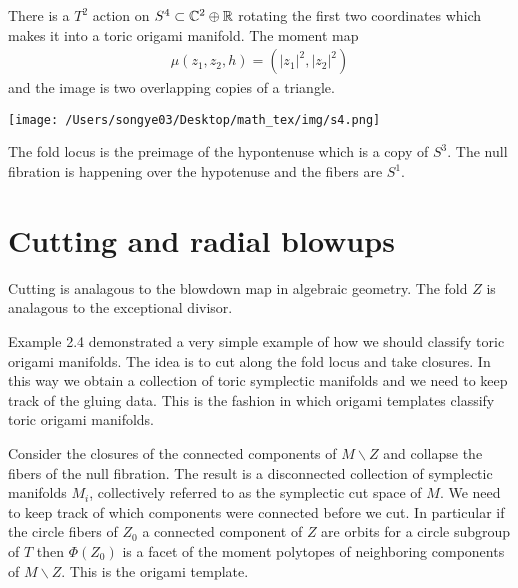 \documentclass[12pt]{article}
\begin{document}
\begin{example}
    There is a $T^2$ action on $S^4 \subset \mathbb{C}^2\oplus \mathbb{R}$
    rotating the first two coordinates which makes it into a toric origami manifold. 
    The moment map \begin{align*}
        \mu(z_1,z_2,h) = (|z_1|^2, |z_2|^2)
    \end{align*} and the image is two overlapping copies of a triangle.
    \begin{center}
        \texttt{[image: /Users/songye03/Desktop/math\_tex/img/s4.png]}
    \end{center}
        
    The fold locus is the preimage of the hypontenuse which is a copy of $S^3$.
    The null fibration is happening over the hypotenuse and the fibers are $S^1$.


    \hfill 

\end{example}

\section{Cutting and radial blowups}
Cutting is analagous to the blowdown map in algebraic geometry. The fold $Z$ is analagous 
to the exceptional divisor. 

\hfill

Example 2.4 demonstrated a very simple example of how we should classify toric origami manifolds.
The idea is to cut along the fold locus and take closures. In this way 
we obtain a collection of toric symplectic manifolds and we need to keep track of
the gluing data. This is the fashion in which origami templates classify toric origami manifolds.

\hfill

Consider the closures of the connected components of $M\backslash Z$ and collapse the fibers of the
null fibration. The result is a disconnected collection of symplectic manifolds $M_i$,
collectively referred to as the symplectic cut space of $M$. We need to 
keep track of which components were connected before we cut. In particular if the circle fibers of $Z_0$ a connected component of $Z$ are orbits
for a circle subgroup of $T$ then $\Phi(Z_0)$ is a facet of the moment polytopes of 
neighboring components of $M\backslash Z$. This is the origami template.
\end{document}
